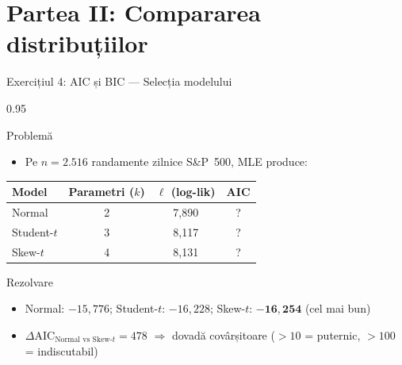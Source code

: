 \documentclass[9pt, aspectratio=169, t]{beamer}
\begin{document}
\section{Partea II: Compararea distribuțiilor}

\begin{frame}{Exercițiul 4: AIC și BIC --- Selecția modelului}
    \begin{cminipage}{0.95\textwidth}
\begin{block}{Problemă}
\begin{itemize}\setlength{\itemsep}{0pt}
    \item Pe $n = 2{.}516$ randamente zilnice S\&P~500, MLE produce:
\end{itemize}
\renewcommand{\arraystretch}{1.1}
\begin{center}
\begin{tabular}{lccc}
\toprule
\textbf{Model} & \textbf{Parametri ($k$)} & $\boldsymbol{\ell}$ (log-lik) & \textbf{AIC} \\
\midrule
Normal & 2 & 7{,}890 & ? \\
Student-$t$ & 3 & 8{,}117 & ? \\
Skew-$t$ & 4 & 8{,}131 & ? \\
\bottomrule
\end{tabular}
\end{center}
\end{block}

\begin{exampleblock}{Rezolvare}
\small
\begin{itemize}\setlength{\itemsep}{0pt}
    \item Normal: $-15{,}776$; Student-$t$: $-16{,}228$; Skew-$t$: $\mathbf{-16{,}254}$ (cel mai bun)
    \item $\Delta\text{AIC}_{\text{Normal vs Skew-}t} = 478$ $\Rightarrow$ dovadă covârșitoare ($>10$ = puternic, $>100$ = indiscutabil)
\end{itemize}
\end{exampleblock}
    \end{cminipage}
\end{frame}
\end{document}
